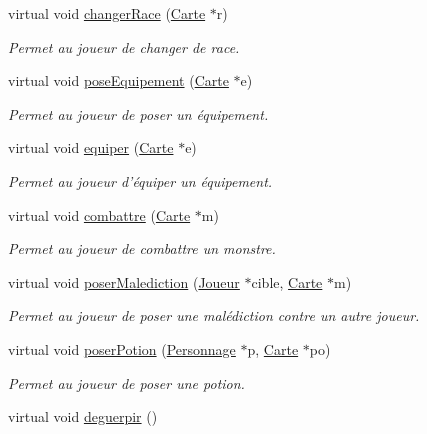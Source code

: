 \begin{DoxyCompactItemize}
\item 
virtual void \hyperlink{class_etat_joueur_ad60942aa96f0bfb05771f787964887fe}{changer\-Race} (\hyperlink{class_carte}{Carte} $\ast$r)
\begin{DoxyCompactList}\small\item\em Permet au joueur de changer de race. \end{DoxyCompactList}\item 
virtual void \hyperlink{class_etat_joueur_a7d3b72dd7a93a787dcea00d606e9eec2}{pose\-Equipement} (\hyperlink{class_carte}{Carte} $\ast$e)
\begin{DoxyCompactList}\small\item\em Permet au joueur de poser un équipement. \end{DoxyCompactList}\item 
virtual void \hyperlink{class_etat_joueur_a2d975d2cd1163a43d6f0002c1f9943e9}{equiper} (\hyperlink{class_carte}{Carte} $\ast$e)
\begin{DoxyCompactList}\small\item\em Permet au joueur d'équiper un équipement. \end{DoxyCompactList}\item 
virtual void \hyperlink{class_etat_joueur_a63c672f1d599a82f88aa80aebedf78d6}{combattre} (\hyperlink{class_carte}{Carte} $\ast$m)
\begin{DoxyCompactList}\small\item\em Permet au joueur de combattre un monstre. \end{DoxyCompactList}\item 
virtual void \hyperlink{class_etat_joueur_a6895655263daefa056c3ee11f716cc28}{poser\-Malediction} (\hyperlink{class_joueur}{Joueur} $\ast$cible, \hyperlink{class_carte}{Carte} $\ast$m)
\begin{DoxyCompactList}\small\item\em Permet au joueur de poser une malédiction contre un autre joueur. \end{DoxyCompactList}\item 
virtual void \hyperlink{class_etat_joueur_a76cf1ff3d4140f182a07167a5053f509}{poser\-Potion} (\hyperlink{class_personnage}{Personnage} $\ast$p, \hyperlink{class_carte}{Carte} $\ast$po)
\begin{DoxyCompactList}\small\item\em Permet au joueur de poser une potion. \end{DoxyCompactList}\item 
\hypertarget{class_etat_joueur_ab2184107646810a3a54f95e1b29acc57}{virtual void \hyperlink{class_etat_joueur_ab2184107646810a3a54f95e1b29acc57}{deguerpir} ()}\label{class_etat_joueur_ab2184107646810a3a54f95e1b29acc57}


\end{DoxyCompactItemize}
